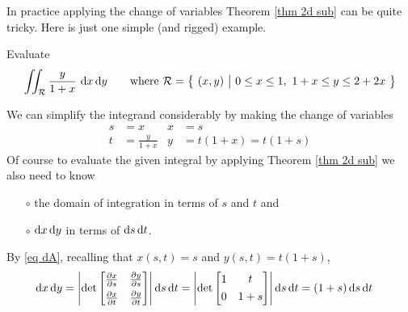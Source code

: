 In practice applying the change of variables Theorem \ref{thm 2d sub} can 
be quite tricky. Here is just one simple (and rigged) example.
\begin{eg}\label{eg 2d sub}
Evaluate
\begin{equation*}
\dblInt_\cR\frac{y}{1+x}\ \dee{x}\,\dee{y}\qquad\text{where }
\cR=\Set{(x,y)}{0\le x\le 1,\ 1+x\le y\le 2+2x}
\end{equation*}

\soln We can simplify the integrand considerably by making the 
change of variables
\begin{align*}
s&=x                    & x&=s \\
t&=\frac{y}{1+x}        & y&=t(1+x) = t(1+s)
\end{align*}
Of course to evaluate the given integral by
applying Theorem \ref{thm 2d sub} we also need to know
\begin{itemize}\itemsep1pt \parskip0pt 
\item[$\circ$] the domain of integration in terms of $s$ and $t$ and
\item[$\circ$] $\mathrm{d}x\,\mathrm{d}y$ in terms of $\mathrm{d}s\,\mathrm{d}t$. 
\end{itemize}

\noindent
By \eqref{eq dA}, recalling that $x(s,t)=s$ and $y(s,t)=t(1+s)$,
\begin{align*}
\dee{x}\,\dee{y}
  &= \left|\det\left[\begin{matrix}\pdiff{x}{s}&\pdiff{y}{s}\\[0.05in] 
                                   \pdiff{x}{t}&\pdiff{y}{t}
       \end{matrix}\right]\right| \dee{s}\,\dee{t} 
   = \left|\det\left[\begin{matrix}1&t\\[0.05in] 
                                   0&1+s
       \end{matrix}\right]\right| \dee{s}\,\dee{t} 
   = (1+s)\,\dee{s}\,\dee{t}
\end{align*}


\end{eg}
